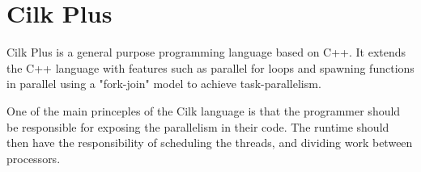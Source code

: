 \section{Cilk Plus}

Cilk Plus is a general purpose programming language based on C++. It extends the C++ language with features such as
parallel for loops and spawning functions in parallel using a "fork-join" model to achieve task-parallelism.

One of the main princeples of the Cilk language is that the programmer should be responsible for exposing the parallelism
in their code. The runtime should then have the responsibility of scheduling the threads, and dividing work between
processors. 


